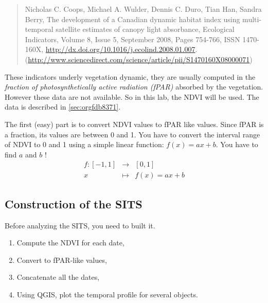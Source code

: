 \documentclass[a4paper,11pt,DIV=18]{scrartcl}
\begin{document}
\begin{quote}
Nicholas C. Coops, Michael A. Wulder, Dennis C. Duro, Tian Han, Sandra
Berry,  The development  of  a Canadian  dynamic  habitat index  using
multi-temporal  satellite   estimates  of  canopy   light  absorbance,
Ecological  Indicators,  Volume  8,  Issue 5,  September  2008,  Pages
754-766,                        ISSN                        1470-160X,
\url{http://dx.doi.org/10.1016/j.ecolind.2008.01.007}.
(\url{http://www.sciencedirect.com/science/article/pii/S1470160X08000071})
\end{quote}

These indicators underly vegetation dynamic, they are usually computed
in the \emph{fraction of photosynthetically active radiation (fPAR)} absorbed
by the vegetation.  However these data  are not available.  So in this
lab, the NDVI will be used. The data is described in \ref{sec:orgfdb8371}.


\begin{work}
The first (easy)  part is to convert NDVI values  to fPAR like values.
Since fPAR is a fraction, its values  are between 0 and 1. You have to
convert the interval  range of NDVI to  0 and 1 using  a simple linear
function: \(f(x)=ax+b\). You have to find \(a\) and \(b\) !
\begin{eqnarray*}
  f:[-1,1] &\to& [0,1]\\
  x&\mapsto&f(x)=ax+b
\end{eqnarray*}
\end{work}

\subsection{Construction of the SITS}
\label{sec:orgcef6b06}
Before analyzing the  SITS, you need to built it.   
\begin{work}
\begin{enumerate}
\item Compute the NDVI for each date,
\item Convert to fPAR-like values,
\item Concatenate all the dates,
\item Using QGIS,  plot the  temporal  profile for  several objects.
\end{enumerate}
\end{work}
\end{document}
